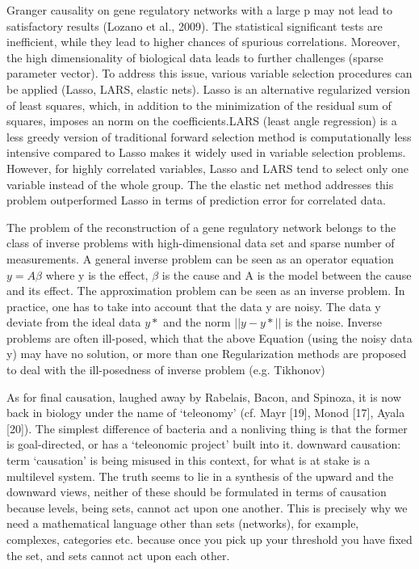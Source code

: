 \documentclass[onecollarge,runningheads]{svjour2}
\begin{document}
Granger causality on gene regulatory networks with a large p may not lead to satisfactory results (Lozano et al., 2009). The statistical significant tests are inefficient, while they lead to higher chances of spurious correlations. Moreover, the high dimensionality of biological data leads to further challenges (sparse parameter vector). To address this issue, various variable selection procedures can be applied (Lasso, LARS, elastic nets).
Lasso is an alternative regularized version of least squares, which, in addition to the minimization of the residual sum of squares, imposes an norm on the coefficients.LARS (least angle regression) is a less greedy version of traditional forward selection method is computationally less intensive compared to Lasso makes it widely used in variable selection problems. However, for highly correlated variables, Lasso and LARS tend to select only one variable instead of the whole group. The the elastic net method addresses this problem outperformed Lasso in terms of prediction error for correlated data.

The problem of the reconstruction of a gene regulatory network belongs to the class of inverse problems with high-dimensional data set and sparse number of measurements. A general inverse problem can be seen as an operator equation $y = A \beta$ where y is the effect, $\beta$ is the cause and A is the model between the cause and its effect. The approximation problem can be seen as an inverse problem.
In practice, one has to take into account that the data y  are noisy. The data y deviate from the ideal data $y*$ and the norm $||y - y* ||$ is the noise. 
Inverse problems are often ill-posed, which that the above Equation (using the noisy data y) may have no solution, or more than one Regularization methods are proposed to deal with the ill-posedness of inverse problem (e.g. Tikhonov)

As for final causation, laughed away by Rabelais, Bacon, and Spinoza, it is now back in biology under the name of ‘teleonomy’ (cf. Mayr [19], Monod [17], Ayala [20]). The simplest difference of bacteria and a nonliving thing is that the former is goal-directed, or has a ‘teleonomic project’ built into it. downward causation: term ‘causation’ is being misused in this context, for what is at stake is a multilevel system.
The truth seems to lie in a synthesis of the upward and the downward views, neither of these should be formulated in terms of causation because levels, being sets, cannot act upon one another.
This is precisely why we need a mathematical language other than sets (networks), for example, complexes, categories etc. because once you pick up your threshold you have fixed the  set, and sets cannot act upon each other.
\end{document}
